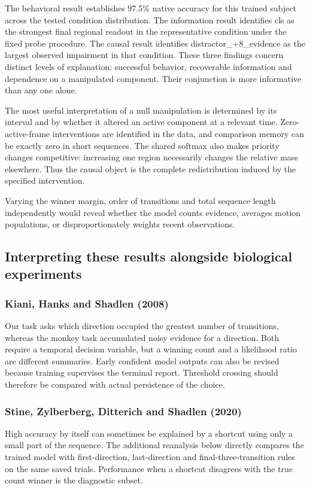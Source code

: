 \documentclass[11pt]{article}
\begin{document}
The behavioral result establishes 97.5\% native accuracy for this trained subject across the tested condition distribution. The information result identifies cls as the strongest final regional readout in the representative condition under the fixed probe procedure. The causal result identifies distractor\_\allowbreak{}+8\_\allowbreak{}evidence as the largest observed impairment in that condition. These three findings concern distinct levels of explanation: successful behavior, recoverable information and dependence on a manipulated component. Their conjunction is more informative than any one alone.

The most useful interpretation of a null manipulation is determined by its interval and by whether it altered an active component at a relevant time. Zero-active-frame interventions are identified in the data, and comparison memory can be exactly zero in short sequences. The shared softmax also makes priority changes competitive: increasing one region necessarily changes the relative mass elsewhere. Thus the causal object is the complete redistribution induced by the specified intervention.

Varying the winner margin, order of transitions and total sequence length independently would reveal whether the model counts evidence, averages motion populations, or disproportionately weights recent observations.

\subsection{Interpreting these results alongside biological experiments}
\subsubsection{Kiani, Hanks and Shadlen (2008)}
Our task asks which direction occupied the greatest number of transitions, whereas the monkey task accumulated noisy evidence for a direction. Both require a temporal decision variable, but a winning count and a likelihood ratio are different summaries. Early confident model outputs can also be revised because training supervises the terminal report. Threshold crossing should therefore be compared with actual persistence of the choice. \cite{bio_kiani}

\subsubsection{Stine, Zylberberg, Ditterich and Shadlen (2020)}
High accuracy by itself can sometimes be explained by a shortcut using only a small part of the sequence. The additional reanalysis below directly compares the trained model with first-direction, last-direction and final-three-transition rules on the same saved trials. Performance when a shortcut disagrees with the true count winner is the diagnostic subset. \cite{bio_stine}
\end{document}
